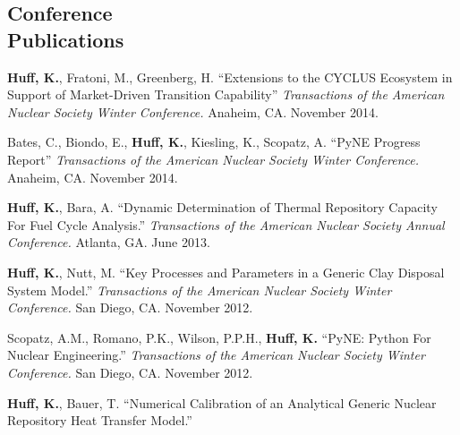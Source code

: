 \documentclass[margin,line]{resume}
\begin{document}
\begin{resume}
    \section{\mysidestyle Conference\\Publications}
    \begin{bibenum}
      \item \textbf{Huff, K.}, Fratoni, M., Greenberg, H. ``Extensions to the CYCLUS Ecosystem in Support of Market-Driven Transition Capability''
         \emph{Transactions of the American Nuclear Society Winter Conference.} 
         Anaheim, CA. November 2014.
      \item Bates, C., Biondo, E., \textbf{Huff, K.}, Kiesling, K., Scopatz, A. ``PyNE Progress Report''
         \emph{Transactions of the American Nuclear Society Winter Conference.} 
         Anaheim, CA. November 2014.
      \item \textbf{Huff, K.}, Bara, A. ``Dynamic Determination of Thermal Repository Capacity For Fuel Cycle Analysis.''
         \emph{Transactions of the American Nuclear Society Annual Conference.} 
         Atlanta, GA. June 2013.
      \item \textbf{Huff, K.}, Nutt, M. ``Key Processes and Parameters in a Generic Clay Disposal System Model.''
         \emph{Transactions of the American Nuclear Society Winter Conference.} 
        San Diego, CA. November 2012.
      \item Scopatz, A.M., Romano, P.K., Wilson, P.P.H., \textbf{Huff, K.} ``PyNE: Python For Nuclear Engineering.''
         \emph{Transactions of the American Nuclear Society Winter Conference.} 
        San Diego, CA. November 2012. 
      \item \textbf{Huff, K.}, Bauer, T. ``Numerical Calibration of an Analytical Generic Nuclear Repository Heat Transfer Model.''

\end{bibenum}
\end{resume}
\end{document}
